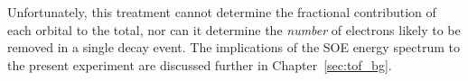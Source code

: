 Unfortunately, this treatment cannot determine the fractional contribution of each orbital to the total, nor can it determine the \emph{number} of electrons likely to be removed in a single decay event.  The implications of the SOE energy spectrum to the present experiment are discussed further in Chapter~\ref{sec:tof_bg}.








